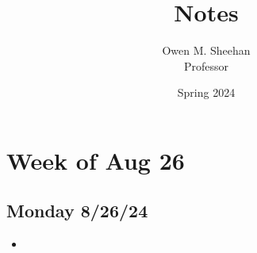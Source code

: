 \documentclass[12pt]{article}
\title{\class{} Notes}
\author{Owen M. Sheehan\\Professor \prof{}}
\date{Spring 2024}
\begin{document}
\maketitle
\tableofcontents
\newpage

    \section{Week of Aug 26}
        \subsection{Monday 8/26/24}
        \bigskip
            \begin{itemize}
                \item 
            \end{itemize}
\end{document}
